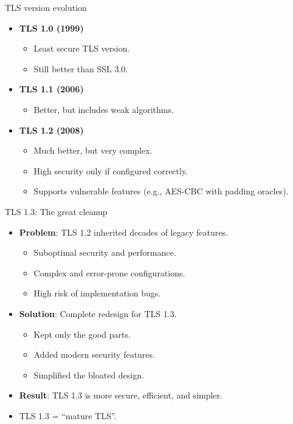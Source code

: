 \documentclass[aspectratio=169, lualatex, handout]{beamer}
\begin{document}
\begin{frame}{TLS version evolution}
	\begin{itemize}[<+->]
		\item \textbf{TLS 1.0 (1999)}
		      \begin{itemize}
			      \item Least secure TLS version.
			      \item Still better than SSL 3.0.
		      \end{itemize}
		\item \textbf{TLS 1.1 (2006)}
		      \begin{itemize}
			      \item Better, but includes weak algorithms.
		      \end{itemize}
		\item \textbf{TLS 1.2 (2008)}
		      \begin{itemize}
			      \item Much better, but very complex.
			      \item High security only if configured correctly.
			      \item Supports vulnerable features (e.g., AES-CBC with padding oracles).
		      \end{itemize}
	\end{itemize}
\end{frame}

\begin{frame}{TLS 1.3: The great cleanup}
	\begin{itemize}[<+->]
		\item \textbf{Problem}: TLS 1.2 inherited decades of legacy features.
		      \begin{itemize}
			      \item Suboptimal security and performance.
			      \item Complex and error-prone configurations.
			      \item High risk of implementation bugs.
		      \end{itemize}
		\item \textbf{Solution}: Complete redesign for TLS 1.3.
		      \begin{itemize}
			      \item Kept only the good parts.
			      \item Added modern security features.
			      \item Simplified the bloated design.
		      \end{itemize}
		\item \textbf{Result}: TLS 1.3 is more secure, efficient, and simpler.
		\item TLS 1.3 = ``mature TLS''.
	\end{itemize}
\end{frame}
\end{document}
